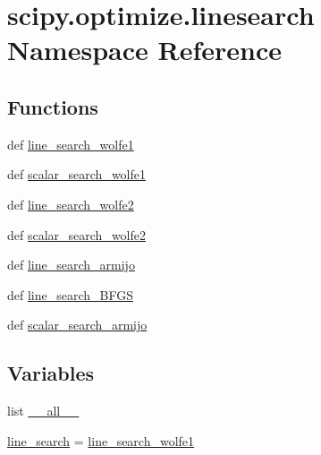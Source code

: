 \hypertarget{namespacescipy_1_1optimize_1_1linesearch}{}\section{scipy.\+optimize.\+linesearch Namespace Reference}
\label{namespacescipy_1_1optimize_1_1linesearch}
\subsection*{Functions}
\begin{DoxyCompactItemize}
\item 
def \hyperlink{namespacescipy_1_1optimize_1_1linesearch_a493e6ce47a10a75918797bd31d6e45f8}{line\+\_\+search\+\_\+wolfe1}
\item 
def \hyperlink{namespacescipy_1_1optimize_1_1linesearch_af336dff853f3e4e6f694eb853b50ba0d}{scalar\+\_\+search\+\_\+wolfe1}
\item 
def \hyperlink{namespacescipy_1_1optimize_1_1linesearch_a91f89f89b468960d956000bcc64d9262}{line\+\_\+search\+\_\+wolfe2}
\item 
def \hyperlink{namespacescipy_1_1optimize_1_1linesearch_a2271529963085031cf938a091b42c7c7}{scalar\+\_\+search\+\_\+wolfe2}
\item 
def \hyperlink{namespacescipy_1_1optimize_1_1linesearch_a9ffcf875a3c5f400ca81ffc62bfe6202}{line\+\_\+search\+\_\+armijo}
\item 
def \hyperlink{namespacescipy_1_1optimize_1_1linesearch_a0d116e4dca1384e35e53ba04806c86df}{line\+\_\+search\+\_\+\+B\+F\+G\+S}
\item 
def \hyperlink{namespacescipy_1_1optimize_1_1linesearch_a999e7311d3781b63e159d4d30cba3b65}{scalar\+\_\+search\+\_\+armijo}
\end{DoxyCompactItemize}
\subsection*{Variables}
\begin{DoxyCompactItemize}
\item 
list \hyperlink{namespacescipy_1_1optimize_1_1linesearch_a43abb0559c075e1f3f528db85543d76d}{\+\_\+\+\_\+all\+\_\+\+\_\+}
\item 
\hyperlink{namespacescipy_1_1optimize_1_1linesearch_abdaf0387f19bd1267f58bff82abafb88}{line\+\_\+search} = \hyperlink{namespacescipy_1_1optimize_1_1linesearch_a493e6ce47a10a75918797bd31d6e45f8}{line\+\_\+search\+\_\+wolfe1}
\end{DoxyCompactItemize}


